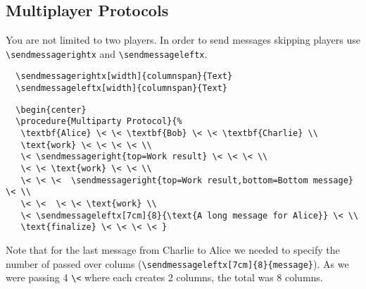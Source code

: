 \documentclass[a4paper]{report}
\begin{document}
  
  
  \subsection{Multiplayer Protocols}
  
  You are not limited to two players. In order to send messages skipping players use \lstinline$\sendmessagerightx$ and \lstinline$\sendmessageleftx$.
  \begin{lstlisting}
  \sendmessagerightx[width]{columnspan}{Text}
  \sendmessageleftx[width]{columnspan}{Text}
  \end{lstlisting}
  
  \begin{center}
  \end{center}
  
  \begin{lstlisting}
  \begin{center}
  \procedure{Multiparty Protocol}{%
   \textbf{Alice} \< \< \textbf{Bob} \< \< \textbf{Charlie} \\
   \text{work} \< \< \< \< \\
   \< \sendmessageright{top=Work result} \< \< \< \\
   \< \< \text{work} \< \< \\
   \< \< \<  \sendmessageright{top=Work result,bottom=Bottom message} \< \\
   \< \<  \< \< \text{work} \\
   \< \sendmessageleftx[7cm]{8}{\text{A long message for Alice}} \< \\
   \text{finalize} \< \< \< \< }
  \end{lstlisting}
  Note that for the last message from Charlie to Alice we needed to specify the number of passed
  over colums (\lstinline$\sendmessageleftx[7cm]{8}{message}$). As we were passing
  4 \lstinline$\<$ where each creates 2 columns, the total was 8 columns.
  
\end{document}
